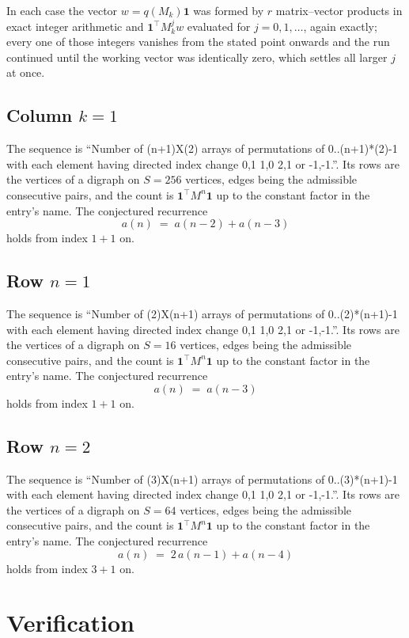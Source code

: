 \documentclass[11pt,a4paper]{article}
\theoremstyle{plain}
\theoremstyle{definition}
\begin{document}
In each case the vector $w=q(M_k)\mathbf{1}$ was formed by $r$ matrix--vector products in
exact integer arithmetic and $\mathbf{1}^{\!\top}M_k^{j}w$ evaluated for $j=0,1,\dots$,
again exactly; every one of those integers vanishes from the stated point onwards and the run
continued until the working vector was identically zero, which settles all larger $j$ at once.

\subsection*{Column $k$$=1$}
The sequence is ``Number of (n+1)X(2) arrays of permutations of 0..(n+1)*(2)-1 with each element having directed index change 0,1 1,0 2,1 or -1,-1.''. Its rows are the vertices of a digraph on
$S=256$ vertices, edges being the admissible consecutive pairs, and the count is
$\mathbf{1}^{\!\top}M^{n}\mathbf{1}$ up to the constant factor in the entry's name.
The conjectured recurrence
\[
a(n)\;=\;a(n-2) + a(n-3)
\]
holds from index $1+1$ on.

\subsection*{Row $n$$=1$}
The sequence is ``Number of (2)X(n+1) arrays of permutations of 0..(2)*(n+1)-1 with each element having directed index change 0,1 1,0 2,1 or -1,-1.''. Its rows are the vertices of a digraph on
$S=16$ vertices, edges being the admissible consecutive pairs, and the count is
$\mathbf{1}^{\!\top}M^{n}\mathbf{1}$ up to the constant factor in the entry's name.
The conjectured recurrence
\[
a(n)\;=\;a(n-3)
\]
holds from index $1+1$ on.

\subsection*{Row $n$$=2$}
The sequence is ``Number of (3)X(n+1) arrays of permutations of 0..(3)*(n+1)-1 with each element having directed index change 0,1 1,0 2,1 or -1,-1.''. Its rows are the vertices of a digraph on
$S=64$ vertices, edges being the admissible consecutive pairs, and the count is
$\mathbf{1}^{\!\top}M^{n}\mathbf{1}$ up to the constant factor in the entry's name.
The conjectured recurrence
\[
a(n)\;=\;2\,a(n-1) + a(n-4)
\]
holds from index $3+1$ on.

\section{Verification}
\end{document}
